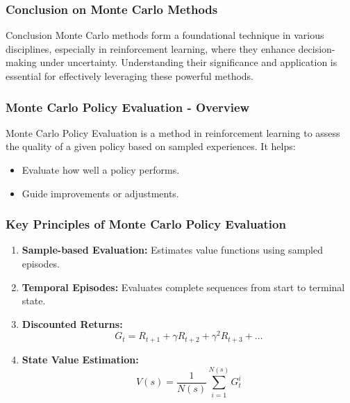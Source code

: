 \documentclass[aspectratio=169]{beamer}
\begin{document}
\begin{frame}[fragile]
    \frametitle{Conclusion on Monte Carlo Methods}
    \begin{block}{Conclusion}
        Monte Carlo methods form a foundational technique in various disciplines, especially in reinforcement learning, where they enhance decision-making under uncertainty. 
        Understanding their significance and application is essential for effectively leveraging these powerful methods.
    \end{block}
\end{frame}

\begin{frame}[fragile]
    \frametitle{Monte Carlo Policy Evaluation - Overview}
    Monte Carlo Policy Evaluation is a method in reinforcement learning to assess the quality of a given policy based on sampled experiences. It helps:
    \begin{itemize}
        \item Evaluate how well a policy performs.
        \item Guide improvements or adjustments.
    \end{itemize}
\end{frame}

\begin{frame}[fragile]
    \frametitle{Key Principles of Monte Carlo Policy Evaluation}
    \begin{enumerate}
        \item \textbf{Sample-based Evaluation:} Estimates value functions using sampled episodes.
        \item \textbf{Temporal Episodes:} Evaluates complete sequences from start to terminal state.
        \item \textbf{Discounted Returns:}
            \begin{equation}
                G_t = R_{t+1} + \gamma R_{t+2} + \gamma^2 R_{t+3} + \ldots
            \end{equation}
        \item \textbf{State Value Estimation:}
            \begin{equation}
                V(s) = \frac{1}{N(s)} \sum_{i=1}^{N(s)} G_t^i
            \end{equation}
    \end{enumerate}
\end{frame}
\end{document}
